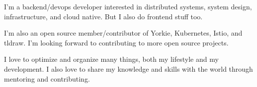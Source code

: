 

\begin{cvparagraph}

I'm a backend/devops developer interested in distributed systems, system design, infrastructure, and cloud native. But I also do frontend stuff too.

I'm also an open source member/contributor of Yorkie, Kubernetes, Istio, and tldraw. I'm looking forward to contributing to more open source projects.

I love to optimize and organize many things, both my lifestyle and my development. I also love to share my knowledge and skills with the world through mentoring and contributing.
\end{cvparagraph}
